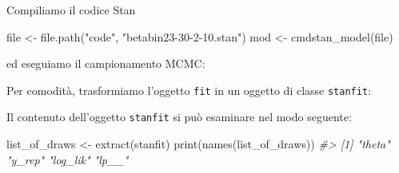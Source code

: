 \documentclass[
  10pt,
  italian,
  a4paper,
  extrafontsizes,onecolumn,openright
  ]{memoir}
\newenvironment{Shaded}{\begin{snugshade}}{\end{snugshade}}
\newcommand{\AttributeTok}[1]{\textcolor[rgb]{0.77,0.63,0.00}{#1}}
\newcommand{\CommentTok}[1]{\textcolor[rgb]{0.56,0.35,0.01}{\textit{#1}}}
\newcommand{\DecValTok}[1]{\textcolor[rgb]{0.00,0.00,0.81}{#1}}
\newcommand{\FunctionTok}[1]{\textcolor[rgb]{0.00,0.00,0.00}{#1}}
\newcommand{\NormalTok}[1]{#1}
\newcommand{\OtherTok}[1]{\textcolor[rgb]{0.56,0.35,0.01}{#1}}
\newcommand{\SpecialCharTok}[1]{\textcolor[rgb]{0.00,0.00,0.00}{#1}}
\newcommand{\StringTok}[1]{\textcolor[rgb]{0.31,0.60,0.02}{#1}}
\begin{document}
\noindent
Compiliamo il codice Stan

\begin{Shaded}
\begin{Highlighting}[]
\NormalTok{file }\OtherTok{\textless{}{-}} \FunctionTok{file.path}\NormalTok{(}\StringTok{"code"}\NormalTok{, }\StringTok{"betabin23{-}30{-}2{-}10.stan"}\NormalTok{)}
\NormalTok{mod }\OtherTok{\textless{}{-}} \FunctionTok{cmdstan\_model}\NormalTok{(file)}
\end{Highlighting}
\end{Shaded}

\noindent
ed eseguiamo il campionamento MCMC:

\begin{Shaded}
\end{Shaded}

\noindent
Per comodità, trasformiamo l'oggetto \texttt{fit} in un oggetto di classe \texttt{stanfit}:

\begin{Shaded}
\end{Shaded}

\noindent
Il contenuto dell'oggetto \texttt{stanfit} si può esaminare nel modo seguente:

\begin{Shaded}
\begin{Highlighting}[]
\NormalTok{list\_of\_draws }\OtherTok{\textless{}{-}} \FunctionTok{extract}\NormalTok{(stanfit)}
\FunctionTok{print}\NormalTok{(}\FunctionTok{names}\NormalTok{(list\_of\_draws))}
\CommentTok{\#\textgreater{} [1] "theta"   "y\_rep"   "log\_lik" "lp\_\_"}
\end{Highlighting}
\end{Shaded}
\end{document}
